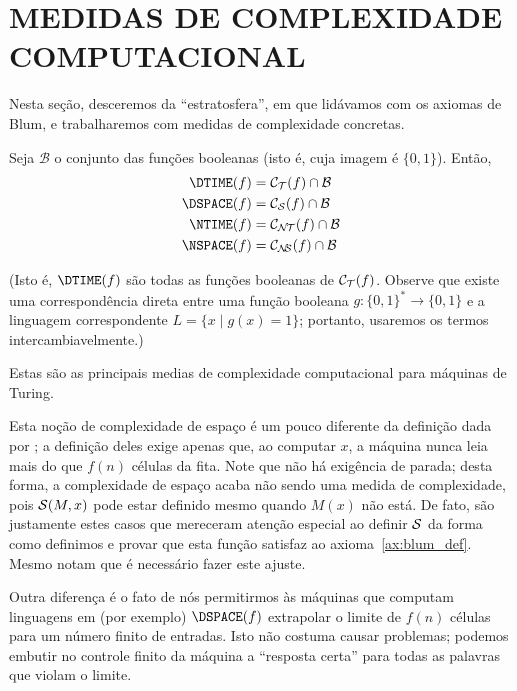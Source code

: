 \section{MEDIDAS DE COMPLEXIDADE COMPUTACIONAL}
\label{sec:default_measures}

Nesta seção,
desceremos da ``estratosfera'',
em que lidávamos com os axiomas de Blum,
e trabalharemos com medidas de complexidade concretas.

\begin{provisionaldefinition}
    Seja $\mathcal B$ o conjunto das funções booleanas
    (isto é, cuja imagem é $\{0, 1\}$).
    Então,
    \begin{align*}
        \DTIME(f) &= \mathcal C_\PhiDT(f) \cap \mathcal B \\
        \DSPACE(f) &= \mathcal C_\PhiDS(f) \cap \mathcal B \\
        \NTIME(f) &= \mathcal C_\PhiNT(f) \cap \mathcal B \\
        \NSPACE(f) &= \mathcal C_\PhiNS(f) \cap \mathcal B
    \end{align*}
\end{provisionaldefinition}

(Isto é, $\DTIME(f)$ são todas as funções booleanas de $\mathcal C_{\mathcal{T}}(f)$.
Observe que existe uma correspondência direta entre
uma função booleana $g : \{0, 1\}^* \to \{0, 1\}$
e a linguagem correspondente $L = \{x \mid g(x) = 1\}$;
portanto,
usaremos os termos intercambiavelmente.)

Estas são as principais medias de complexidade computacional
para máquinas de Turing.

Esta noção de complexidade de espaço
é um pouco diferente da definição dada por
;
a definição deles exige apenas que,
ao computar $x$,
a máquina nunca leia mais do que $f(n)$ células da fita.
Note que não há exigência de parada;
desta forma,
a complexidade de espaço acaba não sendo uma medida de complexidade,
pois ${\mathcal{S}}(M, x)$ pode estar definido
mesmo quando $M(x)$ não está.
De fato,
são justamente estes casos que mereceram
atenção especial ao definir ${\mathcal{S}}$
da forma como definimos
e provar que esta função satisfaz ao axioma~\ref{ax:blum_def}.
Mesmo 
notam que é necessário fazer este ajuste.

Outra diferença é o fato de nós permitirmos
às máquinas que computam linguagens em
(por exemplo) $\DSPACE(f)$
extrapolar o limite de $f(n)$ células
para um número finito de entradas.
Isto não costuma causar problemas;
podemos embutir no controle finito da máquina
a ``resposta certa''
para todas as palavras que violam o limite.


